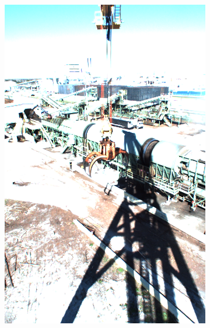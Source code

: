 \begin{figure}[h]
\begin{subfigure}[c]{0.24\textwidth}
			\includegraphics[width=1\textwidth]{bilder/Grundlagen/Daten_Bildqualitaet/hell_schatten.png}
		\end{subfigure}
		\begin{subfigure}[c]{0.24\textwidth}			

\end{subfigure}
\end{figure}
